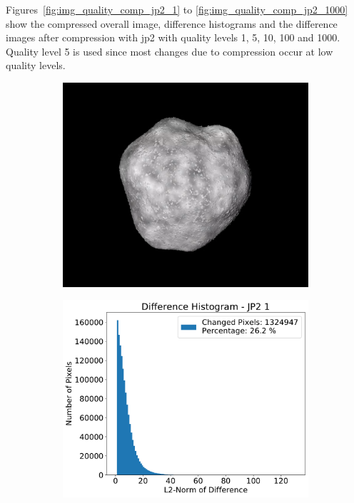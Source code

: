 Figures~\ref{fig:img_quality_comp_jp2_1} to \ref{fig:img_quality_comp_jp2_1000} show the compressed overall image, difference histograms and the difference images after compression with \gls{jp2} with quality levels \SI{1}{}, \SI{5}{}, \SI{10}{}, \SI{100}{} and \SI{1000}{}. Quality level \SI{5}{} is used since most changes due to compression occur at low quality levels.

\begin{figure}[htb]
    \centering
    \begin{subfigure}[b]{0.48\textwidth}
        \centering
        \includegraphics[width=\textwidth]{doc/thesis/0_figures/compare_quality/set1/jp2_1}
        \caption{}
        \label{fig:img_quality_comp_jp2_1_orig}
    \end{subfigure}
    \begin{subfigure}[b]{0.48\textwidth}
        \centering
        \includegraphics[width=\textwidth]{doc/thesis/0_figures/compare_quality/set1/jp2_1_diff_histogram}

\end{subfigure}
\end{figure}
